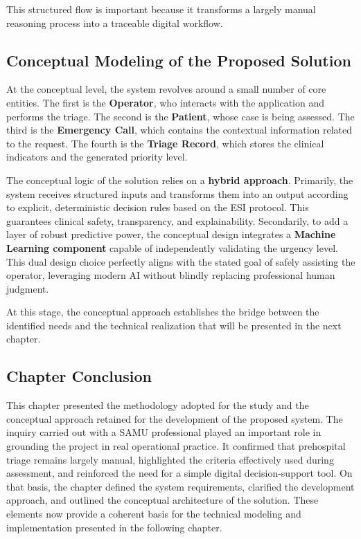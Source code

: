 \documentclass[a4paper,12pt,oneside]{report}
\begin{document}
This structured flow is important because it transforms a largely manual reasoning process into a traceable digital workflow.

\subsection{Conceptual Modeling of the Proposed Solution}

At the conceptual level, the system revolves around a small number of core entities. The first is the \textbf{Operator}, who interacts with the application and performs the triage. The second is the \textbf{Patient}, whose case is being assessed. The third is the \textbf{Emergency Call}, which contains the contextual information related to the request. The fourth is the \textbf{Triage Record}, which stores the clinical indicators and the generated priority level.

The conceptual logic of the solution relies on a \textbf{hybrid approach}. Primarily, the system receives structured inputs and transforms them into an output according to explicit, deterministic decision rules based on the ESI protocol. This guarantees clinical safety, transparency, and explainability. Secondarily, to add a layer of robust predictive power, the conceptual design integrates a \textbf{Machine Learning component} capable of independently validating the urgency level. This dual design choice perfectly aligns with the stated goal of safely assisting the operator, leveraging modern AI without blindly replacing professional human judgment.

At this stage, the conceptual approach establishes the bridge between the identified needs and the technical realization that will be presented in the next chapter.

\subsection*{Chapter Conclusion}

This chapter presented the methodology adopted for the study and the conceptual approach retained for the development of the proposed system. The inquiry carried out with a SAMU professional played an important role in grounding the project in real operational practice. It confirmed that prehospital triage remains largely manual, highlighted the criteria effectively used during assessment, and reinforced the need for a simple digital decision-support tool. On that basis, the chapter defined the system requirements, clarified the development approach, and outlined the conceptual architecture of the solution. These elements now provide a coherent basis for the technical modeling and implementation presented in the following chapter.
\end{document}

